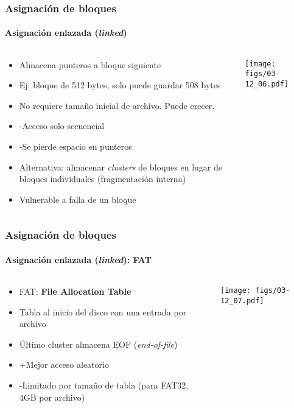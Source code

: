 \documentclass[letter]{beamer}
\begin{document}
\begin{frame}
  \frametitle{Asignación de bloques}
  \framesubtitle{Asignación enlazada ({\em linked})}

  \begin{columns}[c]
    \begin{column}[T]{6cm}
      \begin{itemize}
        \item Almacena punteros
              a bloque siguiente
        \item Ej: bloque de 512 bytes, solo puede guardar 508 bytes
        \item No requiere tamaño inicial de archivo. Puede crecer.
        \item <2-> -Acceso solo secuencial
        \item <3-> -Se pierde espacio en punteros
        \item <4-> Alternativa: almacenar {\em clusters} de bloques en lugar
                   de bloques individuales (fragmentación interna)
        \item <5-> Vulnerable a falla de un bloque
      \end{itemize}
    \end{column}
    \begin{column}[T]{5cm}
      \begin{center}
        \texttt{[image: figs/03-12\_06.pdf]}
      \end{center}
    \end{column}
  \end{columns}  
  
\end{frame}
\begin{frame}
  \frametitle{Asignación de bloques}
  \framesubtitle{Asignación enlazada ({\em linked}): FAT}

  \begin{columns}[c]
    \begin{column}[T]{6cm}
      \begin{itemize}
        \item FAT: {\bf File Allocation Table}
        \item Tabla al inicio del disco con una entrada por archivo
        \item Último cluster almacena EOF ({\em end-of-file})
        \item <2-> +Mejor acceso aleatorio
        \item <3-> -Limitado por tamaño de tabla (para FAT32, 4GB por archivo)
      \end{itemize}
    \end{column}
    \begin{column}[T]{5cm}
      \begin{center}
        \texttt{[image: figs/03-12\_07.pdf]}
      \end{center}
    \end{column}
  \end{columns}  
  
\end{frame}
\end{document}
